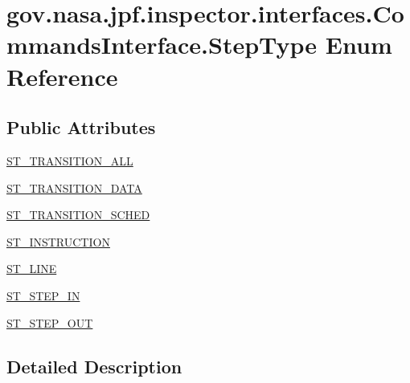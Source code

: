 \hypertarget{enumgov_1_1nasa_1_1jpf_1_1inspector_1_1interfaces_1_1_commands_interface_1_1_step_type}{}\section{gov.\+nasa.\+jpf.\+inspector.\+interfaces.\+Commands\+Interface.\+Step\+Type Enum Reference}
\label{enumgov_1_1nasa_1_1jpf_1_1inspector_1_1interfaces_1_1_commands_interface_1_1_step_type}
\subsection*{Public Attributes}
\begin{DoxyCompactItemize}
\item 
\hyperlink{enumgov_1_1nasa_1_1jpf_1_1inspector_1_1interfaces_1_1_commands_interface_1_1_step_type_acdaea8d97df43a5fc6fd1c9f9f7ca37e}{S\+T\+\_\+\+T\+R\+A\+N\+S\+I\+T\+I\+O\+N\+\_\+\+A\+LL}
\item 
\hyperlink{enumgov_1_1nasa_1_1jpf_1_1inspector_1_1interfaces_1_1_commands_interface_1_1_step_type_a2ec92d5c4443f054f8a4c8ce1733e3ec}{S\+T\+\_\+\+T\+R\+A\+N\+S\+I\+T\+I\+O\+N\+\_\+\+D\+A\+TA}
\item 
\hyperlink{enumgov_1_1nasa_1_1jpf_1_1inspector_1_1interfaces_1_1_commands_interface_1_1_step_type_a170e079b171c6f563ab22145123d4e95}{S\+T\+\_\+\+T\+R\+A\+N\+S\+I\+T\+I\+O\+N\+\_\+\+S\+C\+H\+ED}
\item 
\hyperlink{enumgov_1_1nasa_1_1jpf_1_1inspector_1_1interfaces_1_1_commands_interface_1_1_step_type_a6c3b00b14cb19949d53de12f80d36404}{S\+T\+\_\+\+I\+N\+S\+T\+R\+U\+C\+T\+I\+ON}
\item 
\hyperlink{enumgov_1_1nasa_1_1jpf_1_1inspector_1_1interfaces_1_1_commands_interface_1_1_step_type_ab8ef08157f5b627f07c9f7e2ea71c568}{S\+T\+\_\+\+L\+I\+NE}
\item 
\hyperlink{enumgov_1_1nasa_1_1jpf_1_1inspector_1_1interfaces_1_1_commands_interface_1_1_step_type_a510ea1d3ee21b6056549364352e26dfe}{S\+T\+\_\+\+S\+T\+E\+P\+\_\+\+IN}
\item 
\hyperlink{enumgov_1_1nasa_1_1jpf_1_1inspector_1_1interfaces_1_1_commands_interface_1_1_step_type_aa1a566d7ef680bc49ccaa4f710384a7b}{S\+T\+\_\+\+S\+T\+E\+P\+\_\+\+O\+UT}
\end{DoxyCompactItemize}


\subsection{Detailed Description}


